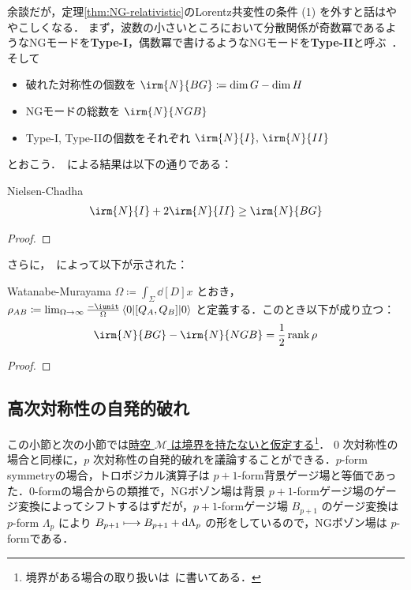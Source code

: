 \documentclass[TQFT_main]{subfiles}
\begin{document}
余談だが，定理\ref{thm:NG-relativistic}のLorentz共変性の条件 (1) を外すと話はややこしくなる．
まず，波数の小さいところにおいて分散関係が奇数冪であるようなNGモードを\textbf{Type-I}，偶数冪で書けるようなNGモードを\textbf{Type-II}と呼ぶ~\cite{nielsen1976HowCount}．
そして 
\begin{itemize}
    \item 破れた対称性の個数を $\irm{N}{BG} \coloneqq \dim G - \dim H$
    \item NGモードの総数を $\irm{N}{NGB}$
    \item Type-I, Type-IIの個数をそれぞれ $\irm{N}{I},\, \irm{N}{II}$
\end{itemize}
とおこう．~\cite{nielsen1976HowCount}による結果は以下の通りである：

\begin{mytheo}[label=thm:NG-nonrel]{Nielsen-Chadha}
    \begin{align}
        \irm{N}{I} + 2 \irm{N}{II} \ge \irm{N}{BG}
    \end{align}
\end{mytheo}

\begin{proof}
    
\end{proof}

さらに，~\cite{watanabe2012UnifiedDescription}によって以下が示された：

\begin{mytheo}[label=thm:NG-nonrel-count]{Watanabe-Murayama}
    $\Omega \coloneqq \int_\Sigma \dd[D]{x}$ とおき，$\rho_{AB} \coloneqq \lim_{\Omega \to \infty} \frac{-\iunit}{\Omega} \mel{0}{\comm{Q_A}{Q_B}}{0}$ と定義する．このとき以下が成り立つ：
    \begin{align}
        \irm{N}{BG} - \irm{N}{NGB} = \frac{1}{2} \rank \rho
    \end{align}
\end{mytheo}

\begin{proof}
    
\end{proof}

\subsection{高次対称性の自発的破れ}

この小節と次の小節では\underline{時空 $\mathcal{M}$ は境界を持たないと仮定する}\footnote{境界がある場合の取り扱いは~\cite{Lake2018SSB}に書いてある．}．
$0$ 次対称性の場合と同様に，$p$ 次対称性の自発的破れを議論することができる．$p$-form symmetryの場合，トロポジカル演算子は $p+1$-form背景ゲージ場と等価であった．$0$-formの場合からの類推で，NGボゾン場は背景 $p+1$-formゲージ場のゲージ変換によってシフトするはずだが，$p+1$-formゲージ場 $B_{p+1}$ のゲージ変換は $p$-form $\Lambda_p$ により $B_{p+1} \longmapsto B_{p+1} + \dd{\Lambda_p}$ の形をしているので，NGボゾン場は $p$-formである．
\end{document}
